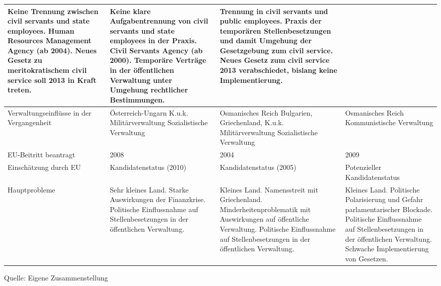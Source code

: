 \begin{longtable}[H]{|L{24mm}|C{34mm}|C{34mm}|C{34mm}|}
Keine Trennung zwischen civil servants und state employees.
Human Resources Management Agency 
(ab 2004).
Neues Gesetz zu meritokratischem civil service soll 2013 in Kraft treten.&
 Keine klare Aufgabentrennung von civil servants und state employees in der Praxis.
Civil Servants Agency (ab 2000).
Temporäre Verträge in der öffentlichen Verwaltung unter Umgehung rechtlicher Bestimmungen.&
Trennung in civil servants und public employees. 
Praxis der temporären Stellenbesetzungen und damit Umgehung der Gesetzgebung zum civil service.
Neues Gesetz zum civil service 2013 verabschiedet, bislang keine Implementierung.\\\hline
Verwaltungseinflüsse in der Vergangenheit&
Österreich-Ungarn
K.u.k. Militärverwaltung
Sozialistische Verwaltung &
Osmanisches Reich
Bulgarien, Griechenland, 
K.u.k. Militärverwaltung
Sozialistische Verwaltung &
Osmanisches Reich 
Kommunistische Verwaltung \\\hline
EU-Beitritt beantragt&
2008&
2004&
2009\\\hline
Einschätzung durch EU&
Kandidatenstatus (2010)&
Kandidatenstatus (2005)&
Potenzieller Kandidatenstatus\\\hline
Hauptprobleme&
Sehr kleines Land.
Starke Auswirkungen der Finanzkrise.
Politische Einflussnahme auf Stellenbesetzungen in der öffentlichen Verwaltung.&
Kleines Land.
Namensstreit mit Griechenland.
Minderheitenproblematik mit Auswirkungen auf öffentliche Verwaltung.
Politische Einflussnahme auf Stellenbesetzungen in der öffentlichen Verwaltung.&
Kleines Land.
Politische Polarisierung und Gefahr parlamentarischer Blockade.
Politische Einflussnahme auf Stellenbesetzungen in der öffentlichen Verwaltung.
Schwache Implementierung von Gesetzen.\\\hline

\end{longtable}
Quelle: Eigene Zusammenstellung

